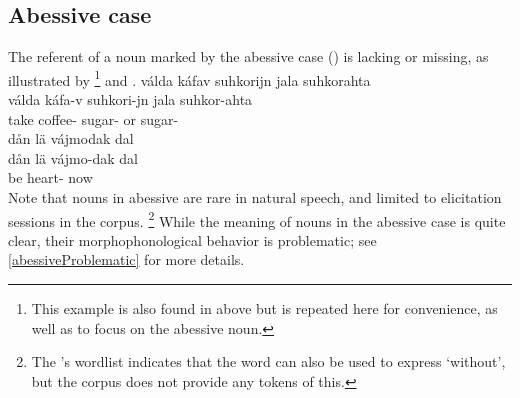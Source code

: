 \subsection{Abessive case}\label{abessive}
The referent of a noun marked by the abessive case (\ABESSs) is lacking or missing, as illustrated by \footnote{This example is also found in  above but is repeated here for convenience, as well as to focus on the abessive noun.} 
and . 
\ea\label{abess1}
\glll	válda káfav suhkorijn jala {suhkorahta}\\
	válda káfa-v suhkori-jn jala suhkor-ahta\\
	take\BS{} coffee- sugar- or sugar-\\\nopagebreak
{} 
\z
%
\ea\label{abess2}
\glll	dån lä {vájmodak} dal\\
	dån lä vájmo-dak dal\\
	 be\BS{} heart- now\\\nopagebreak
{} 
\z
Note that nouns in abessive are rare in natural speech, and limited to elicitation sessions in the corpus.%
\footnote{The \WLP’s wordlist indicates that the word  can also be used to express ‘without’, but the corpus does not provide any tokens of this.} 
While the meaning of nouns in the abessive case is quite clear, their morphophonological behavior is problematic; see \SEC\ref{abessiveProblematic} for more details.


